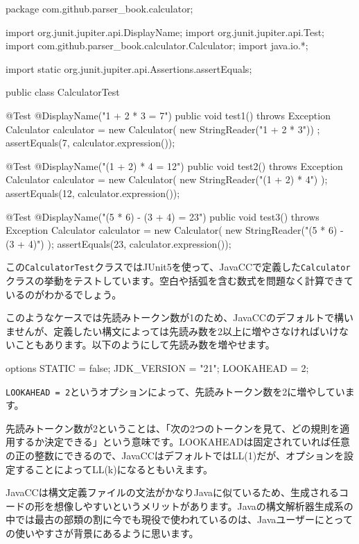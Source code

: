 \begin{codescreen}{}
package com.github.parser_book.calculator;

import org.junit.jupiter.api.DisplayName;
import org.junit.jupiter.api.Test;
import com.github.parser_book.calculator.Calculator;
import java.io.*;

import static org.junit.jupiter.api.Assertions.assertEquals;

public class CalculatorTest {
    @Test
    @DisplayName("1 + 2 * 3 = 7")
    public void test1() throws Exception {
        Calculator calculator = new Calculator(
            new StringReader("1 + 2 * 3"))
        ;
        assertEquals(7, calculator.expression());
    }

    @Test
    @DisplayName("(1 + 2) * 4 = 12")
    public void test2() throws Exception {
        Calculator calculator = new Calculator(
            new StringReader("(1 + 2) * 4")
        );
        assertEquals(12, calculator.expression());
    }

    @Test
    @DisplayName("(5 * 6) - (3 + 4) = 23")
    public void test3() throws Exception {
        Calculator calculator = new Calculator(
            new StringReader("(5 * 6) - (3 + 4)")
        );
        assertEquals(23, calculator.expression());
    }
}
\end{codescreen}

この\texttt{CalculatorTest}クラスではJUnit5を使って、JavaCCで定義した\texttt{Calculator}クラスの挙動をテストしています。空白や括弧を含む数式を問題なく計算できているのがわかるでしょう。

このようなケースでは先読みトークン数が1のため、JavaCCのデフォルトで構いませんが、定義したい構文によっては先読み数を2以上に増やさなければいけないこともあります。以下のようにして先読み数を増やせます。

\begin{codescreen}{}
options {
  STATIC = false;
  JDK_VERSION = "21";
  LOOKAHEAD = 2;
}
\end{codescreen}

\texttt{LOOKAHEAD\ =\ 2}というオプションによって、先読みトークン数を2に増やしています。

先読みトークン数が2ということは、「次の2つのトークンを見て、どの規則を適用するか決定できる」という意味です。LOOKAHEADは固定されていれば任意の正の整数にできるので、JavaCCはデフォルトではLL(1)だが、オプションを設定することによってLL(k)になるともいえます。

JavaCCは構文定義ファイルの文法がかなりJavaに似ているため、生成されるコードの形を想像しやすいというメリットがあります。Javaの構文解析器生成系の中では最古の部類の割に今でも現役で使われているのは、Javaユーザーにとっての使いやすさが背景にあるように思います。

